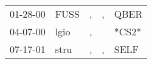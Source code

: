 \begin{supertabular}{p{0.07\textwidth}p{0.06\textwidth}p{0.02\textwidth}p{0.02\textwidth}p{0.06\textwidth}}
 01-28-00\textsuperscript{} &  FUSS\textsuperscript{} &  , &  , &  QBER\textsuperscript{} \\
 04-07-00\textsuperscript{} &  lgio\textsuperscript{} &  , &    &                   *CS2* \\
 07-17-01\textsuperscript{} &  stru\textsuperscript{} &  , &  , &  SELF\textsuperscript{} \\
\end{supertabular}
